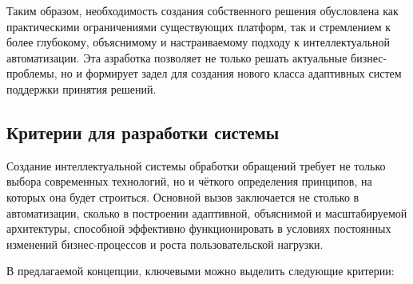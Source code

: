 Таким образом, необходимость создания собственного решения обусловлена как практическими ограничениями существующих платформ, так и стремлением к более глубокому, объяснимому и настраиваемому подходу к интеллектуальной автоматизации. Эта азработка позволяет не только решать актуальные бизнес-проблемы, но и формирует задел для создания нового класса адаптивных систем поддержки принятия решений.

\subsection{Критерии для разработки системы}

Создание интеллектуальной системы обработки обращений требует не только выбора современных технологий, но и чёткого определения принципов, на которых она будет строиться. Основной вызов заключается не столько в автоматизации, сколько в построении адаптивной, объяснимой и масштабируемой архитектуры, способной эффективно функционировать в условиях постоянных изменений бизнес-процессов и роста пользовательской нагрузки.

В предлагаемой концепции, ключевыми можно выделить следующие критерии:

